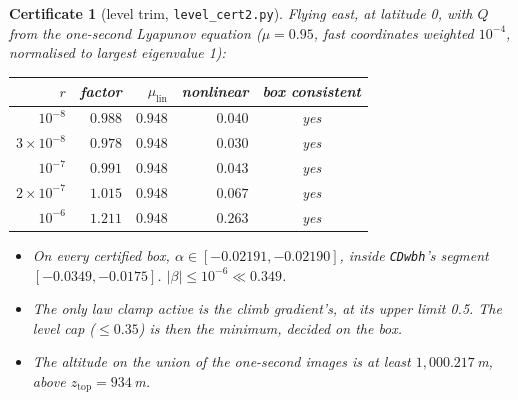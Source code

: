 \documentclass[11pt]{article}
\newtheorem{cert}{Certificate}
\newcommand{\zTop}{z_{\mathrm{top}}}
\begin{document}
\begin{cert}[level trim, \texttt{level\_cert2.py}]\label{cert:levelcert2}
Flying east, at latitude 0, with $Q$ from the one-second Lyapunov equation ($\mu = 0.95$, fast coordinates weighted $10^{-4}$, normalised to largest eigenvalue 1):

\begin{center}
\begin{tabular}{rrrrc}
\toprule
$r$ & factor & $\mu_{\mathrm{lin}}$ & nonlinear & box consistent \\
\midrule
$10^{-8}$ & $0.988$ & $0.948$ & $0.040$ & yes \\
$3\times10^{-8}$ & $\mathbf{0.978}$ & $0.948$ & $0.030$ & yes \\
$10^{-7}$ & $0.991$ & $0.948$ & $0.043$ & yes \\
$2\times10^{-7}$ & $1.015$ & $0.948$ & $0.067$ & yes \\
$10^{-6}$ & $1.211$ & $0.948$ & $0.263$ & yes \\
\bottomrule
\end{tabular}
\end{center}

\begin{itemize}
\item On every certified box, $\alpha \in [-0.02191, -0.02190]$, inside \texttt{CDwbh}'s segment $[-0.0349, -0.0175]$. $|\beta| \le 10^{-6} \ll 0.349$.
\item The only law clamp active is the climb gradient's, at its upper limit 0.5. The level cap ($\le 0.35$) is then the minimum, decided on the box.
\item The altitude on the union of the one-second images is at least $1{,}000.217$\,m, above $\zTop = 934$\,m.
\end{itemize}
\end{cert}
\end{document}
